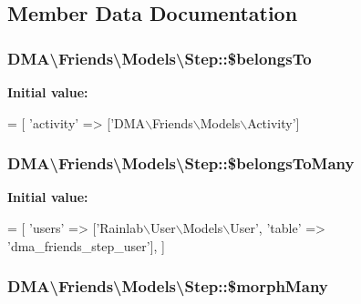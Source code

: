 \subsection{Member Data Documentation}
\hypertarget{classDMA_1_1Friends_1_1Models_1_1Step_a1e83eefa3362e3a1ec89b5599823c22d}{
\subsubsection[{\$belongs\+To}]{\setlength{\rightskip}{0pt plus 5cm}D\+M\+A\textbackslash{}\+Friends\textbackslash{}\+Models\textbackslash{}\+Step\+::\$belongs\+To}}\label{classDMA_1_1Friends_1_1Models_1_1Step_a1e83eefa3362e3a1ec89b5599823c22d}
{\bfseries Initial value\+:}
\begin{DoxyCode}
= [
        \textcolor{stringliteral}{'activity'}  => [\textcolor{stringliteral}{'DMA\(\backslash\)Friends\(\backslash\)Models\(\backslash\)Activity'}]
\end{DoxyCode}
\hypertarget{classDMA_1_1Friends_1_1Models_1_1Step_ac0b25912a2d3c62aa72e15e443648d81}{
\subsubsection[{\$belongs\+To\+Many}]{\setlength{\rightskip}{0pt plus 5cm}D\+M\+A\textbackslash{}\+Friends\textbackslash{}\+Models\textbackslash{}\+Step\+::\$belongs\+To\+Many}}\label{classDMA_1_1Friends_1_1Models_1_1Step_ac0b25912a2d3c62aa72e15e443648d81}
{\bfseries Initial value\+:}
\begin{DoxyCode}
= [
        \textcolor{stringliteral}{'users'} => [\textcolor{stringliteral}{'Rainlab\(\backslash\)User\(\backslash\)Models\(\backslash\)User'}, \textcolor{stringliteral}{'table'} => \textcolor{stringliteral}{'dma\_friends\_step\_user'}],
    ]
\end{DoxyCode}
\hypertarget{classDMA_1_1Friends_1_1Models_1_1Step_ae1aa1ff83758491327ea35861828b233}{
\subsubsection[{\$morph\+Many}]{\setlength{\rightskip}{0pt plus 5cm}D\+M\+A\textbackslash{}\+Friends\textbackslash{}\+Models\textbackslash{}\+Step\+::\$morph\+Many}}\label{classDMA_1_1Friends_1_1Models_1_1Step_ae1aa1ff83758491327ea35861828b233}
